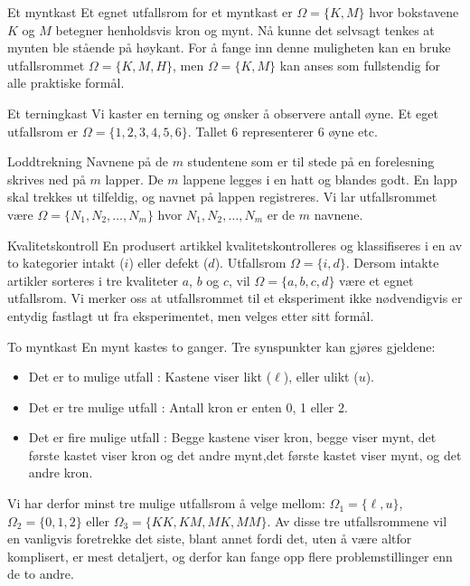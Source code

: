 \begin{eksempel}{Et myntkast}
Et egnet utfallsrom for et myntkast er $\Omega=\{K,M\}$ hvor
bokstavene $K$ og $M$ betegner henholdsvis kron og mynt. Nå
kunne det selvsagt tenkes at mynten ble stående på høykant.
For å fange inn denne muligheten kan en bruke utfallsrommet
$\Omega=\{K,M,H\}$, men $\Omega=\{K,M\}$ kan anses som
fullstendig for alle praktiske formål.
\end{eksempel}

\begin{eksempel}{Et terningkast}
Vi kaster en terning og ønsker å observere antall øyne. Et
eget utfallsrom er $\Omega=\{1,2,3,4,5,6\}$. Tallet 6
representerer 6 øyne etc.
\end{eksempel}

\begin{eksempel}{Loddtrekning}
Navnene på de $m$ studentene som er til stede på en forelesning
skrives ned på $m$ lapper. De $m$ lappene legges i en hatt og
blandes godt. En lapp skal trekkes ut tilfeldig, og navnet på
lappen registreres. Vi lar utfallsrommet være $\Omega=\{N_1,
N_2, \ldots,N_m\}$ hvor $N_1, N_2, \ldots,N_m$ er de $m$ navnene.
\end{eksempel}

\begin{eksempel}{Kvalitetskontroll}
En produsert artikkel kvalitetskontrolleres og klassifiseres i en
av to kate\-gorier intakt ($i$) eller defekt ($d$). Utfallsrom
$\Omega=\{i,d\}$. Dersom intakte artikler sorteres i tre
kvaliteter $a$, $b$ og $c$, vil $\Omega=\{a,b,c,d\}$ være et egnet
utfallsrom. Vi merker oss at utfallsrommet til et eksperiment
ikke nødvendigvis er entydig fastlagt ut fra eksperimentet, men
velges etter sitt formål.
\end{eksempel}

\begin{eksempel}{To myntkast}
En mynt kastes to ganger. Tre synspunkter kan gjøres gjeldene:
\begin{itemize}
\item  Det er to mulige utfall : Kastene viser likt ($\ell$), eller ulikt ($u$).
\item  Det er tre mulige utfall : Antall kron er enten 0, 1 eller 2.
\item Det er fire mulige utfall : Begge kastene viser kron,
     begge viser mynt, det første kastet viser kron og det andre
     mynt,det første kastet viser mynt, og det andre kron.
\end{itemize}
Vi har derfor minst tre mulige utfallsrom å velge mellom:
$\Omega_1=\{\ell, u\}$, $\Omega_2=\{0,1,2\}$ eller $\Omega_3=\{KK, KM,
MK, MM\}$. Av disse tre utfalls\-rommene vil en vanligvis
foretrekke det siste, blant annet fordi det, uten å være altfor
komplisert, er mest detaljert, og derfor kan fange opp flere
problemstillinger enn de to andre.
\end{eksempel}


